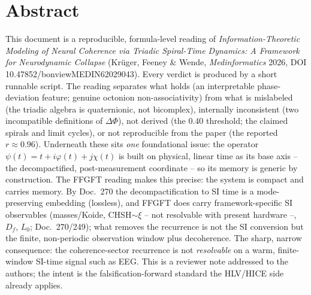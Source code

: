 
\section*{Abstract}
This document is a reproducible, formula-level reading of \emph{Information-Theoretic
Modeling of Neural Coherence via Triadic Spiral-Time Dynamics: A Framework for
Neurodynamic Collapse} (Kr\"uger, Feeney \& Wende, \emph{Medinformatics} 2026,
DOI 10.47852/bonviewMEDIN62029043). Every verdict is produced by a short runnable
script. The reading separates what holds (an interpretable phase-deviation feature;
genuine octonion non-associativity) from what is mislabeled (the triadic algebra is
quaternionic, not bicomplex), internally inconsistent (two incompatible definitions of
$\Delta\Phi$), not derived (the $0.40$ threshold; the claimed spirals and limit cycles),
or not reproducible from the paper (the reported $r\approx0.96$). Underneath these sits
\emph{one} foundational issue: the operator $\psi(t)=t+i\varphi(t)+j\chi(t)$ is built on
physical, linear time as its base axis -- the decompactified, post-measurement coordinate
-- so its memory is generic by construction. The FFGFT reading makes this precise: the
system is compact and carries memory. By Doc.~270 the decompactification to SI time is a
mode-preserving embedding (lossless), and FFGFT does carry framework-specific SI
observables (masses/Koide, CHSH$\sim\xi$ -- not resolvable with present hardware --, $D_f$, $L_0$; Doc.~270/249); what removes the
recurrence is not the SI conversion but the finite, non-periodic observation window plus
decoherence. The sharp, narrow consequence: the coherence-sector recurrence is not
\emph{resolvable} on a warm, finite-window SI-time signal such as EEG. This is a reviewer note addressed to the authors; the
intent is the falsification-forward standard the HLV/HICE side already applies.

